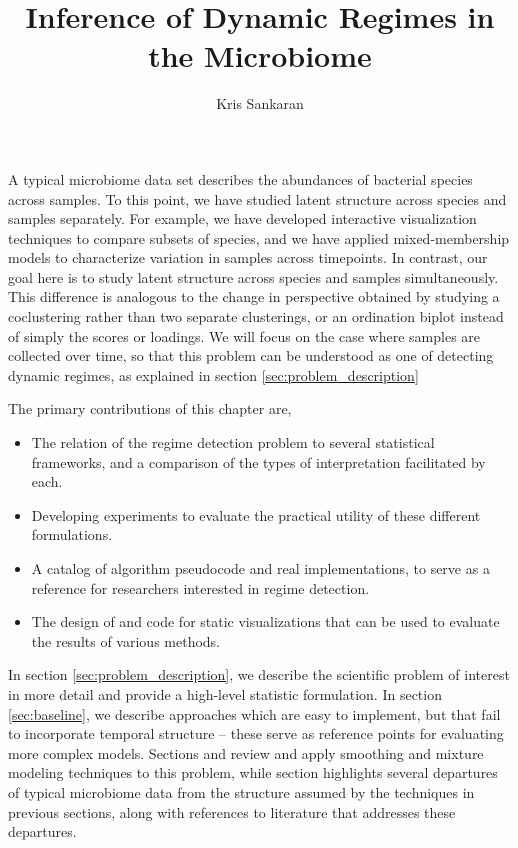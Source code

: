 \documentclass{article}
\title{Inference of Dynamic Regimes in the Microbiome}
\author{Kris Sankaran}
\begin{document}
\maketitle

A typical microbiome data set describes the abundances of bacterial species
across samples. To this point, we have studied latent structure across species
and samples separately. For example, we have developed interactive visualization
techniques to compare subsets of species, and we have applied mixed-membership
models to characterize variation in samples across timepoints. In contrast, our
goal here is to study latent structure across species and samples
simultaneously. This difference is analogous to the change in perspective
obtained by studying a coclustering rather than two separate clusterings, or an
ordination biplot instead of simply the scores or loadings. We will focus on the
case where samples are collected over time, so that this problem can be
understood as one of detecting dynamic regimes, as explained in section
\ref{sec:problem_description}

The primary contributions of this chapter are,
\begin{itemize}
\item The relation of the regime detection problem to several statistical
  frameworks, and a comparison of the types of interpretation facilitated by
  each.
\item Developing experiments to evaluate the practical utility of these
  different formulations.
\item A catalog of algorithm pseudocode and real implementations, to serve as a
  reference for researchers interested in regime detection.
\item The design of and code for static visualizations that can be used to
  evaluate the results of various methods.
\end{itemize}

In section \ref{sec:problem_description}, we describe the scientific problem of
interest in more detail and provide a high-level statistic formulation. In
section \ref{sec:baseline}, we describe approaches which are easy to implement,
but that fail to incorporate temporal structure -- these serve as reference
points for evaluating more complex models.
Sections \label{sec:temporal_probabilistic_models}
and \label{sec:temporal_mixture_models} review and apply smoothing and mixture
modeling techniques to this problem, while
section \label{sec:alternative_probabilistic_models} highlights several
departures of typical microbiome data from the structure assumed by the
techniques in previous sections, along with references to literature that
addresses these departures.
\end{document}
